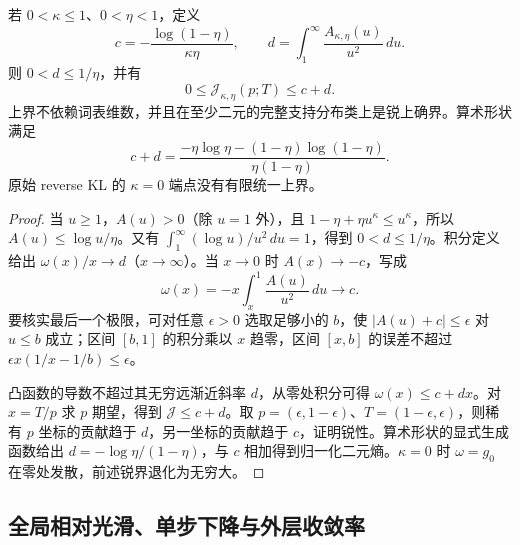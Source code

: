 \begin{theorem}[精确 MD 目标的锐统一上界]
\label{thm:power-md-uniform-cap}
若 $0<\kappa\le1$、$0<\eta<1$，定义
\begin{equation}
 c=-\frac{\log(1-\eta)}{\kappa\eta},\qquad
 d=\int_1^\infty\frac{A_{\kappa,\eta}(u)}{u^2}\,du.
\end{equation}
则 $0<d\le1/\eta$，并有
\begin{equation}
 0\le\mathcal J_{\kappa,\eta}(p;T)\le c+d.
 \label{eq:power-md-uniform-cap}
\end{equation}
上界不依赖词表维数，并且在至少二元的完整支持分布类上是锐上确界。算术形状满足
\begin{equation}
 c+d=\frac{-\eta\log\eta-(1-\eta)\log(1-\eta)}{\eta(1-\eta)}.
\end{equation}
原始 reverse KL 的 $\kappa=0$ 端点没有有限统一上界。
\end{theorem}

\begin{proof}
当 $u\ge1$，$A(u)>0$（除 $u=1$ 外），且 $1-\eta+\eta u^\kappa\le u^\kappa$，所以 $A(u)\le\log u/\eta$。又有 $\int_1^\infty(\log u)/u^2\,du=1$，得到 $0<d\le1/\eta$。积分定义给出 $\omega(x)/x\to d$（$x\to\infty$）。当 $x\to0$ 时 $A(x)\to-c$，写成
\begin{equation}
 \omega(x)=-x\int_x^1\frac{A(u)}{u^2}\,du\longrightarrow c.
\end{equation}
要核实最后一个极限，可对任意 $\epsilon>0$ 选取足够小的 $b$，使 $|A(u)+c|\le\epsilon$ 对 $u\le b$ 成立；区间 $[b,1]$ 的积分乘以 $x$ 趋零，区间 $[x,b]$ 的误差不超过 $\epsilon x(1/x-1/b)\le\epsilon$。

凸函数的导数不超过其无穷远渐近斜率 $d$，从零处积分可得 $\omega(x)\le c+dx$。对 $x=T/p$ 求 $p$ 期望，得到 $\mathcal J\le c+d$。取 $p=(\epsilon,1-\epsilon)$、$T=(1-\epsilon,\epsilon)$，则稀有 $p$ 坐标的贡献趋于 $d$，另一坐标的贡献趋于 $c$，证明锐性。算术形状的显式生成函数给出 $d=-\log\eta/(1-\eta)$，与 $c$ 相加得到归一化二元熵。$\kappa=0$ 时 $\omega=g_0$ 在零处发散，前述锐界退化为无穷大。
\end{proof}
\subsection{全局相对光滑、单步下降与外层收敛率}


